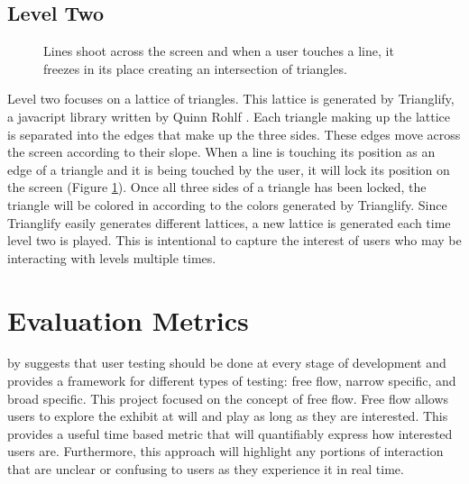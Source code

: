 \documentclass[10pt,twocolumn]{article}
\begin{document}
\subsection{Level Two}

\begin{figure}[hbh]
\begin{center}
\vspace{.5cm}
\caption{Lines shoot across the screen and when a user touches a line, it freezes in its place creating an intersection of triangles.}
\label{fig:middle_tri}
\end{center}
\end{figure} 

Level two focuses on a lattice of triangles.  This lattice is generated by Trianglify, a javacript library written by Quinn Rohlf \cite{rohlf_trianglify_2022}.  Each triangle making up the lattice is separated into the edges that make up the three sides.  These edges move across the screen according to their slope.  When a line is touching its position as an edge of a triangle and it is being touched by the user, it will lock its position on the screen (Figure \ref{fig:middle_tri}).  Once all three sides of a triangle has been locked, the triangle will be colored in according to the colors generated by Trianglify. Since Trianglify easily generates different lattices, a new lattice is generated each time level two is played.  This is intentional to capture the interest of users who may be interacting with levels multiple times.   

\section{Evaluation Metrics}
 by \citeauthor{bernhaupt_video_2010} suggests that user testing should be done at every stage of development and provides a framework for different types of testing: free flow, narrow specific, and broad specific.  This project focused on the concept of free flow. Free flow allows users to explore the exhibit at will and play as long as they are interested.  This provides a useful time based metric that will quantifiably express how interested users are.  Furthermore, this approach will highlight any portions of interaction that are unclear or confusing to users as they experience it in real time. 
\end{document}

